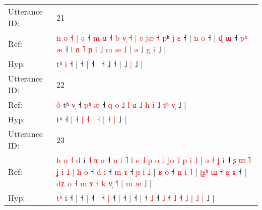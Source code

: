 \documentclass[10pt]{article}
\DeclareRobustCommand{\hl}[1]{{\textcolor{red}{#1}}}
\begin{document}
\begin{longtable}{ll}
 \\
\midrule
Utterance ID: & 21 \\
Ref: & \hl{n}\hl{ }\hl{o}\hl{ }\hl{˧}\hl{ }\hl{|}\hl{ }\hl{ə}\hl{ }\hl{˧}\hl{ }\hl{m}\hl{ }\hl{ɑ}\hl{ }\hl{˧}\hl{ }\hl{b}\hl{ }\hl{v}\hl{̩}\hl{ }\hl{˧}\hl{ }\hl{|}\hl{ }\hl{s}\hl{ }\hl{j}\hl{æ}\hl{ }\hl{˧}\hl{ }\hl{p}ʰ\hl{ }\hl{j} \hl{ɛ} ˧ |\hl{ }\hl{n}\hl{ }\hl{o} ˧ |\hl{ }\hl{ɖ}\hl{ }\hl{ɯ} ˧\hl{ }\hl{p}\hl{ʰ} \hl{æ} ˧\hl{ }\hl{l}\hl{ }\hl{ɑ}\hl{ }\hl{˥}\hl{ }\hl{ɲ}\hl{ }\hl{i} ˩\hl{ }\hl{m}\hl{ }\hl{æ} \hl{˩} |\hl{ }\hl{ə} ˩\hl{ }\hl{g} \hl{i} ˩ |
 \\
Hyp: & \hl{}\hl{}\hl{}\hl{}\hl{}\hl{}\hl{}\hl{}\hl{}\hl{}\hl{}\hl{}\hl{}\hl{}\hl{}\hl{}\hl{}\hl{}\hl{}\hl{}\hl{}\hl{}\hl{}\hl{}\hl{}\hl{}\hl{}\hl{}\hl{}\hl{}\hl{}\hl{}\hl{}\hl{}\hl{t}ʰ\hl{}\hl{} \hl{i} ˧ |\hl{}\hl{}\hl{}\hl{} ˧ |\hl{}\hl{}\hl{}\hl{} ˧\hl{}\hl{}\hl{} \hl{|} ˧\hl{}\hl{}\hl{}\hl{}\hl{}\hl{}\hl{}\hl{}\hl{}\hl{} ˩\hl{}\hl{}\hl{}\hl{} \hl{˧} |\hl{}\hl{} ˩\hl{}\hl{} \hl{|} ˩ |
 \\
\midrule
Utterance ID: & 22 \\
Ref: & \hl{o}\hl{̃}\hl{ }tʰ\hl{ }\hl{v}\hl{̩} ˧\hl{ }\hl{p}\hl{ʰ} \hl{æ} ˧\hl{ }\hl{q}\hl{ }\hl{o}\hl{ }\hl{˩}\hl{ }\hl{l} \hl{ɑ} \hl{˩} \hl{h} \hl{i}\hl{̃} \hl{˩} \hl{t}\hl{ʰ} \hl{v}\hl{̩} ˩ |
 \\
Hyp: & \hl{}\hl{}\hl{}tʰ\hl{}\hl{}\hl{} ˧\hl{}\hl{}\hl{} \hl{|} ˧\hl{}\hl{}\hl{}\hl{}\hl{}\hl{}\hl{}\hl{} \hl{|} \hl{˧} \hl{|} \hl{}\hl{˧} \hl{|} \hl{}\hl{˧} \hl{}\hl{|} ˩ |
 \\
\midrule
Utterance ID: & 23 \\
Ref: & \hl{h}\hl{ }\hl{o}\hl{ }\hl{˧}\hl{ }\hl{d} i\hl{ }\hl{˧}\hl{ }\hl{ʁ}\hl{ }\hl{o} ˧\hl{ }\hl{n}\hl{ }\hl{i}\hl{ }\hl{˥}\hl{ }\hl{l}\hl{ }\hl{e}\hl{ }\hl{˩}\hl{ }\hl{p}\hl{ }\hl{o}\hl{ }\hl{˩}\hl{ }\hl{j}\hl{o}\hl{ }\hl{˩}\hl{ }\hl{p}\hl{ }\hl{i}\hl{ }\hl{˩} |\hl{ }\hl{ə} ˧\hl{ }\hl{ʝ} \hl{i} ˧\hl{ }\hl{ʂ}\hl{ }\hl{ɯ}\hl{ }\hl{˥}\hl{ }\hl{ʝ}\hl{ }\hl{i}\hl{ }\hl{˩} |\hl{ }\hl{h}\hl{ }\hl{o} ˧\hl{ }\hl{d} \hl{i} ˧\hl{ }\hl{m} \hl{ɤ} ˧\hl{ }\hl{ɲ}\hl{ }\hl{i}\hl{ }\hl{˩} |\hl{ }\hl{ʁ}\hl{ }\hl{o} ˧\hl{ }\hl{n}\hl{ }\hl{i}\hl{ }\hl{˥} |\hl{ }\hl{ʈ}\hl{ʂ}\hl{ʰ}\hl{ }\hl{ɯ} ˧\hl{ }\hl{g} \hl{ɤ} ˧\hl{ }\hl{|}\hl{ }\hl{d}\hl{ʑ} \hl{o} ˧\hl{ }\hl{m} \hl{ɤ} ˧\hl{ }\hl{k}\hl{ }\hl{v}\hl{̩} \hl{˧}\hl{˥} | \hl{m} \hl{æ} ˩ |
 \\
Hyp: & \hl{}\hl{}\hl{}\hl{}\hl{}\hl{t}\hl{ʰ} i\hl{}\hl{}\hl{}\hl{}\hl{}\hl{} ˧\hl{}\hl{}\hl{}\hl{}\hl{}\hl{}\hl{}\hl{}\hl{}\hl{}\hl{}\hl{}\hl{}\hl{}\hl{}\hl{}\hl{}\hl{}\hl{}\hl{}\hl{}\hl{}\hl{}\hl{}\hl{}\hl{}\hl{}\hl{}\hl{} |\hl{}\hl{} ˧\hl{}\hl{} \hl{|} ˧\hl{}\hl{}\hl{}\hl{}\hl{}\hl{}\hl{}\hl{}\hl{}\hl{}\hl{}\hl{} |\hl{}\hl{}\hl{}\hl{} ˧\hl{}\hl{} \hl{|} ˧\hl{}\hl{} \hl{|} ˧\hl{}\hl{}\hl{}\hl{}\hl{}\hl{} |\hl{}\hl{}\hl{}\hl{} ˧\hl{}\hl{}\hl{}\hl{}\hl{}\hl{} |\hl{}\hl{}\hl{}\hl{}\hl{}\hl{} ˧\hl{}\hl{} \hl{˩} ˧\hl{}\hl{}\hl{}\hl{}\hl{} \hl{˩} ˧\hl{}\hl{} \hl{˩} ˧\hl{}\hl{}\hl{}\hl{}\hl{} \hl{}\hl{˩} | \hl{˩} \hl{|} ˩ |

\end{longtable}
\end{document}
